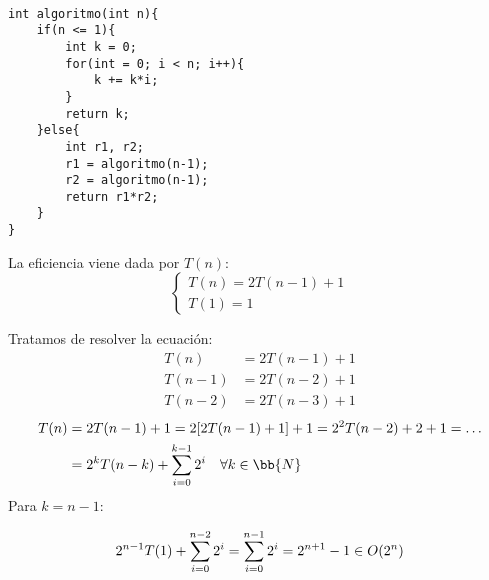 \begin{ejemplo}
\ \\
\begin{listing}[H]
\begin{verbatim}
int algoritmo(int n){
    if(n <= 1){
        int k = 0;
        for(int = 0; i < n; i++){
            k += k*i;
        }
        return k;
    }else{
        int r1, r2;
        r1 = algoritmo(n-1);
        r2 = algoritmo(n-1);
        return r1*r2;
    }
}
\end{verbatim}
\end{listing}
La eficiencia viene dada por $T(n)$:
\begin{equation*}
    \left\{ \begin{array}{l}
        T(n) = 2T(n-1) +1 \\
        T(1) = 1
    \end{array}\right.
\end{equation*}

Tratamos de resolver la ecuación:
\begin{align*}
    T(n) &= 2T(n-1) + 1\\
    T(n-1) &= 2T(n-2) + 1\\
    T(n-2) &= 2T(n-3) + 1
\end{align*}
\begin{align*}
    T(n) &= 2T(n-1) +1=2[2T(n-1)+1]+1 = 2^2T(n-2)+2+1 = \ldots\\
         &= 2^k T(n-k) + \sum_{i=0}^{k-1} 2^i \quad \forall k \in \bb{N}
\end{align*}
Para $k = n-1$:  
  
\begin{equation*}
2^{n-1}T(1) + \sum_{i=0}^{n-2} 2^i = \sum_{i=0}^{n-1} 2^i = 2^{n+1}-1\in O(2^n)$$
\end{equation*}
\end{ejemplo}

